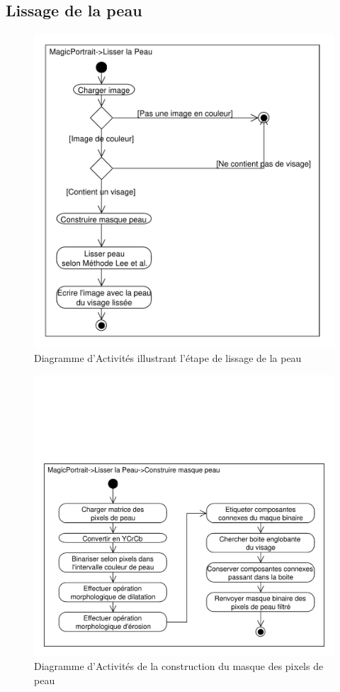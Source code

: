 \documentclass[11pt, french]{report-rd-info}
\begin{document}
\subsection{Lissage de la peau}
\begin{figure}
\centering
\includegraphics[scale=0.5]{Diagrammes/DiagrammeActivites_10_LissagePeau}
\caption{Diagramme d'Activités illustrant l'étape de lissage de la peau}
\label{diag:diagramme10}
\end{figure}

\begin{figure}
\centering
\includegraphics[scale=0.5]{Diagrammes/DiagrammeActivites_11_LissagePeau_Masque}
\caption{Diagramme d'Activités de la construction du masque des pixels de peau}
\label{diag:diagramme11}
\end{figure}
\end{document}

